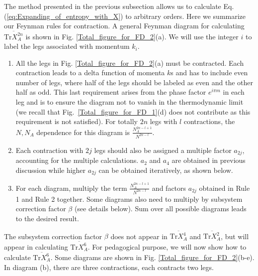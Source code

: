 \documentclass[aps,onecolumn,nofootinbib,superscriptaddress,notitlepage,longbibliography]{revtex4-1}
\providecommand{\tabularnewline}{\\}
\def \Tr {\mathrm{Tr}}
\begin{document}

The method presented in the previous subsection allows us to calculate
Eq. (\ref{eq:Expanding_of_entropy_with_X}) to arbitrary orders. Here
we summarize our Feynman rules for contraction. A general Feynman diagram
for calculating $\overline{\Tr X_{A}^{2n}}$ is shown in Fig. \ref{Total_figure_for_FD_2}(a).
We will use the integer $i$ to label the legs associated with momentum
$k_{i}$. 
\begin{enumerate}
\item All the legs in Fig. \ref{Total_figure_for_FD_2}(a) must be contracted.  Each contraction leads to a delta function of momenta $k$s and has to include even number of legs, where half of the legs should be labeled
as even and the other half as odd. This last requirement arises from the phase factor $e^{i\pi m}$ in each leg and is to ensure the diagram %
not to vanish in the thermodynamic limit %
(we recall that Fig.~\ref{Total_figure_for_FD_1}(d) does not contribute as this requirement is not satisfied). For totally $2n$ legs with $l$ contractions, the $N,N_{A}$ dependence for this diagram is
$\frac{N_{A}^{2n-l+1}}{N^{2n-l}}$.
\item Each contraction with $2j$ legs should also be assigned a multiple
factor $a_{2j}$, accounting for the multiple calculations. $a_{2}$ and $a_{4}$ are obtained in previous discussion while higher $a_{2j}$ can be obtained iteratively, as shown below.
\item For each diagram, multiply the term $\frac{N_{A}^{2n-l+1}}{N^{2n-l}}$ and factors $a_{2j}$ obtained in Rule 1 and Rule 2 together. Some diagrams also need to multiply by subsystem correction factor $\beta$ (see details below). Sum over all possible diagrams leads to the desired result.
\end{enumerate}
The subsystem correction factor $\beta$ does not appear in $\overline{\Tr X_{A}^{4}}$ and $\overline{\Tr X_{A}^{2}}$, but will appear in calculating $\overline{\Tr X_{A}^{6}}$. For pedagogical purpose, we will now show how to calculate $\overline{\Tr X_{A}^{6}}$. Some diagrams are shown in Fig. \ref{Total_figure_for_FD_2}(b-e).
In diagram (b), there are three contractions, each contracts two legs.
\end{document}
